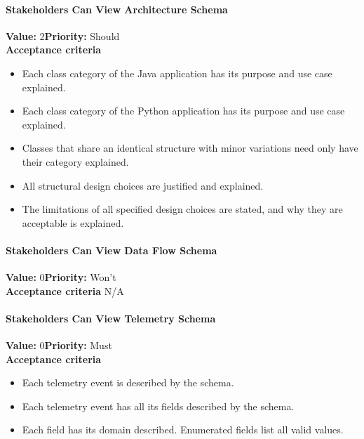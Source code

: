 \paragraph{Stakeholders Can View Architecture Schema}
\textbf{Value:} 2\quad \textbf{Priority:} Should\\
\textbf{Acceptance criteria}
\begin{itemize}
  \item Each class category of the Java application has its purpose and use case explained.
  \item Each class category of the Python application has its purpose and use case explained.
  \item Classes that share an identical structure with minor variations need only have their category explained.
  \item All structural design choices are justified and explained.
  \item The limitations of all specified design choices are stated, and why they are acceptable is explained.
\end{itemize}

\paragraph{Stakeholders Can View Data Flow Schema}
\textbf{Value:} 0\quad \textbf{Priority:} Won't\\
\textbf{Acceptance criteria} N/A

\paragraph{Stakeholders Can View Telemetry Schema}
\textbf{Value:} 0\quad \textbf{Priority:} Must\\
\textbf{Acceptance criteria}
\begin{itemize}
  \item Each telemetry event is described by the schema.
  \item Each telemetry event has all its fields described by the schema.
  \item Each field has its domain described. Enumerated fields list all valid values.
\end{itemize}

